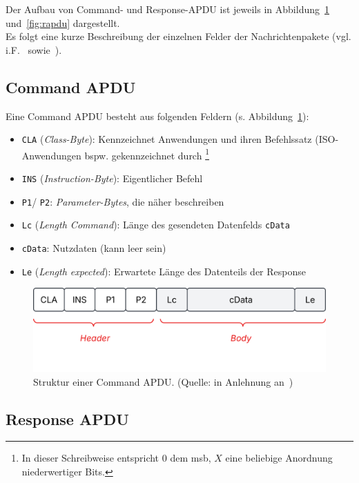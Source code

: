 \noindent
Der Aufbau von Command- und Response-APDU ist jeweils in Abbildung~\ref{fig:capdu} und~\ref{fig:rapdu} dargestellt.\\
Es folgt eine kurze Beschreibung der einzelnen Felder der Nachrichtenpakete (vgl. i.F.~\cite[23 ff.]{ITS5} sowie~\cite[430 ff.]{RF02}).

\subsection*{Command APDU}

Eine Command APDU besteht aus folgenden Feldern (s. Abbildung~\ref{fig:capdu}):

\begin{itemize}
    \itemsep0.5em
    \item \texttt{CLA} (\textit{Class-Byte}): Kennzeichnet Anwendungen und ihren Befehlssatz (ISO-Anwendungen bspw. gekennzeichnet durch \footnote{
    In dieser Schreibweise entspricht $0$ dem msb, $X$ eine beliebige Anordnung niederwertiger Bits.
    }
    \item \texttt{INS} (\textit{Instruction-Byte}): Eigentlicher Befehl
    \item \texttt{P1}/ \texttt{P2}: \textit{Parameter-Bytes}, die  näher beschreiben
    \item \texttt{Lc} (\textit{Length Command}): Länge des gesendeten Datenfelds \texttt{cData}
    \item \texttt{cData}: Nutzdaten (kann leer sein)
    \item \texttt{Le} (\textit{Length expected}): Erwartete Länge des Datenteils der Response
 \end{itemize}

\begin{figure}
    \centering
    \includegraphics[scale=0.4]{aufgabe 1/img/capdu.svg}
    \caption{Struktur einer Command APDU. (Quelle: in Anlehnung an~\cite[\textbf{Abb 2.5}, 23]{ITS5})}
    \label{fig:capdu}
\end{figure}


\subsection*{Response APDU}

